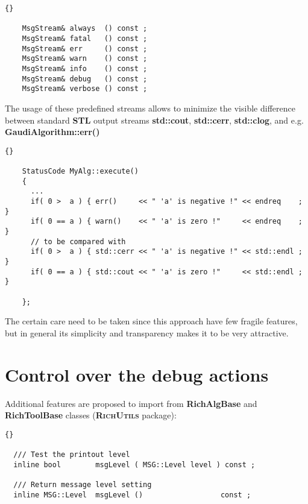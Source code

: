 \documentclass{lhcbnote}
\newcommand{\bftt}         {\ttfamily\bfseries}
\newcommand{\scbf}         {\scshape\bfseries}
\begin{document}
\begin{scriptsize}
  \begin{lstlisting}{}

    MsgStream& always  () const ;
    MsgStream& fatal   () const ;
    MsgStream& err     () const ;
    MsgStream& warn    () const ;
    MsgStream& info    () const ;
    MsgStream& debug   () const ;
    MsgStream& verbose () const ;

  \end{lstlisting}
\end{scriptsize}

The usage of these predefined streams 
allows to minimize the visible difference between 
standard {\scbf{STL}} output streams 
{\bftt{std::cout}}, {\bftt{std::cerr}},
{\bftt{std::clog}}, and e.g. {\bftt{GaudiAlgorithm::err()}}

\begin{scriptsize}
 \begin{lstlisting}{}

    StatusCode MyAlg::execute() 
    {
      ...
      if( 0 >  a ) { err()     << " 'a' is negative !" << endreq    ; }
      if( 0 == a ) { warn()    << " 'a' is zero !"     << endreq    ; }
      // to be compared with 
      if( 0 >  a ) { std::cerr << " 'a' is negative !" << std::endl ; }
      if( 0 == a ) { std::cout << " 'a' is zero !"     << std::endl ; }

    };

 \end{lstlisting}
\end{scriptsize}

The certain care need to be taken since this approach have 
few fragile features, but in general its simplicity and 
transparency makes it to be very attractive. 

\section{Control over the debug actions}
Additional features are proposed to import from 
{\bftt{RichAlgBase}} and {\bftt{RichToolBase}} classes
({\scbf{RichUtils}} package): 

\begin{scriptsize}
 \begin{lstlisting}{}

  /// Test the printout level
  inline bool        msgLevel ( MSG::Level level ) const ;

  /// Return message level setting
  inline MSG::Level  msgLevel ()                  const ;

 \end{lstlisting}
\end{scriptsize}
\end{document}
